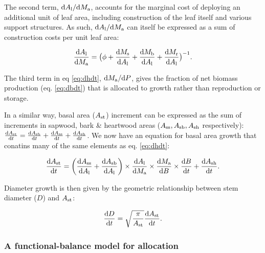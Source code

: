 \documentclass[12pt, a4paper]{article}
\begin{document}
The second term, ${\rm d}A_{\rm l} / {\rm d}M_{\rm a}$,
accounts for the marginal cost of deploying an additional unit of leaf
area, including construction of the leaf itself and various support
structures. As such, ${\rm d}A_{\rm l} / {\rm d}M_{\rm a}$
can itself be expressed as a sum of construction costs per unit leaf
area:

\begin{equation}\label{eq:daldmt}
\frac{{\rm d}A_{\rm l}}{{\rm d}M_{\rm a}}
= \big(\phi
 + \frac{{\rm d}M_\textrm{s}}{{\rm d}A_{\rm l}} + \frac{{\rm d}M_{\rm b}}{{\rm d}A_{\rm l}} + \frac{{\rm d}M_{\rm r}}{{\rm d}A_{\rm l}}\big)^{-1}.
\end{equation}

The third term in eq \ref{eq:dhdt},
${\rm d}M_{\rm a} / {\rm d}P$, gives the fraction of net
biomass production (eq. \ref{eq:dbdt}) that is allocated to growth
rather than reproduction or storage.

In a similar way, basal area ($A_{\rm st}$) increment can be
expressed as the sum of increments in sapwood, bark \& heartwood areas
($A_\textrm{ss}, A_{\rm sb}, A_{\rm sh}$ respectively):
$\frac{{\rm d}A_{\rm st}}{{\rm d}t}= \frac{{\rm d}A_{\rm sb}}{{\rm d}t} + \frac{{\rm d}A_\textrm{ss}}{{\rm d}t} + \frac{{\rm d}A_{\rm sh}}{{\rm d}t}$.
We now have an equation for basal area growth that conatins many of the same
elements as eq. \ref{eq:dhdt}:

\begin{equation}\label{eq:dast}
\frac{{\rm d}A_{\rm st}}{{\rm d}t}=
\left(\frac{{\rm d}A_\textrm{ss}}{{\rm d}A_{\rm l}} + \frac{{\rm d}A_{\rm sb}}{{\rm d}A_{\rm l}}\right) \times
\frac{{\rm d}A_{\rm l}}{{\rm d}M_{\rm a}} \times \frac{{\rm d}M_{\rm a}}{{\rm d}B} \times \frac{{\rm d}B}{{\rm d}t} +\frac{{\rm d}A_{\rm sh}}{{\rm d}t} .
\end{equation}

Diameter growth is then given by the geometric relationship between stem
diameter ($D$) and $A_{\rm st}$:

\begin{equation} \label{eq:dDdt}
\frac{{\rm d}D}{{\rm d}t}= \sqrt{\frac{\pi}{A_{\rm st}}} \frac{{\rm d}A_{\rm st}}{{\rm d}t}.
\end{equation}

\subsubsection{A functional-balance model for allocation}
\end{document}
